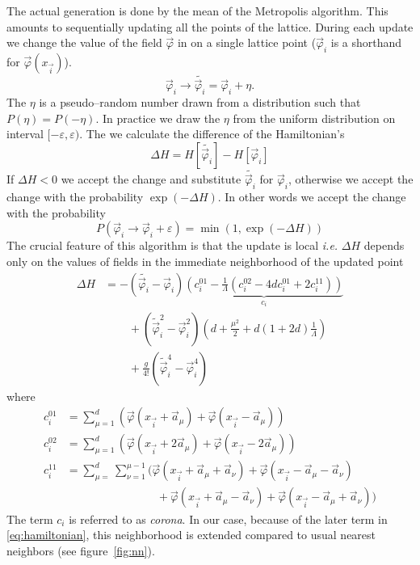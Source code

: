 \documentclass[a4paper]{llncs}
\renewcommand{\a}[1]{\v{a}_{#1}}
\renewcommand{\v}[1]{\vec{#1}}
\newcommand{\vphi}{\vec{\varphi}}
\newcommand{\vi}{{\vec{i}}}
\begin{document}
The actual generation is done by the mean of the Metropolis
algorithm. This amounts to sequentially updating all the points of the
lattice. During each update we change the value of the field $\vphi$
in on a single lattice point ($\vphi_i$ is a shorthand for $\vphi(x_\vi)$).
\begin{equation}
\vphi_i\longrightarrow\widetilde{\vphi_i}=\vphi_i+\eta.
\end{equation}
The $\eta$ is a pseudo--random number drawn from a distribution such
that $P(\eta) = P(-\eta)$. In practice we draw the $\eta$ from the
uniform distribution on interval $[-\varepsilon,\varepsilon)$.  The we
calculate the difference of the Hamiltonian's
\begin{equation}
\Delta H=H[\widetilde{\vphi_i}]-H[\vphi_i]
\end{equation}
If $\Delta H < 0$ we accept the change and substitute
$\widetilde{\vphi_i}$ for $\vphi_i$, otherwise we accept the change
with the probability $\exp(-\Delta H)$. In other words we accept the
change with the probability
\begin{equation}
P(\vphi_i\rightarrow\vphi_i+\varepsilon)=\min\left(1,\exp(-\Delta H)\right)
\end{equation}
The crucial feature of this algorithm is that the update is local {\em
  i.e.} $\Delta H$ depends only on the values of fields in the
immediate neighborhood of the updated point 
\begin{equation}
\begin{split}
\Delta H & = -(\widetilde{\vphi_i}-\vphi_i)
\underbrace{\left(c^{01}_i-\frac{1}{\Lambda}(c^{02}_i-4 d c^{01}_i+2 c^{11}_i )\right)}_{c_i}\\ 
&\phantom{= -}
+(\widetilde{\vphi}^2_i-\vphi_i^2)\left(d+\frac{\mu^2}{2}+d (1+2d)\frac{1}{\Lambda}\right)\\
&\phantom{= -}+\frac{g}{4!}\left(\widetilde{\vphi}^4_i-\vphi^4_i\right)
\end{split}
\end{equation}
where
\begin{equation}\begin{split} 
c_i^{01}&=\sum_{\mu=1}^d\left(\vphi(x_\vi+\a\mu)+\vphi(x_\vi-\a\mu)\right)\\
c_i^{02}&=\sum_{\mu=1}^d\left(\vphi(x_\vi+2\a\mu)+\vphi(x_\vi-2\a\mu)\right)\\
c_i^{11}&=\sum_{\mu=}^d\sum_{\nu=1}^{\mu-1}
\bigl(\vphi(x_\vi+\a\mu+\a\nu)+\vphi(x_\vi-\a\mu-\a\nu)\\
&\phantom{+=\sum_{\mu=}^d\sum_{\nu=1}^{\mu-1}
}
+ \vphi(x_\vi+\a\mu-\a\nu)+\vphi(x_\vi-\a\mu+\a\nu)
\bigr)
\end{split}
\end{equation}
The term $c_i$ is referred to as {\em corona}. 
In our case, because of
the later term in \eqref{eq:hamiltonian}, this neighborhood is
extended compared to usual nearest neighbors (see figure~\ref{fig:nn}). 
\end{document}
